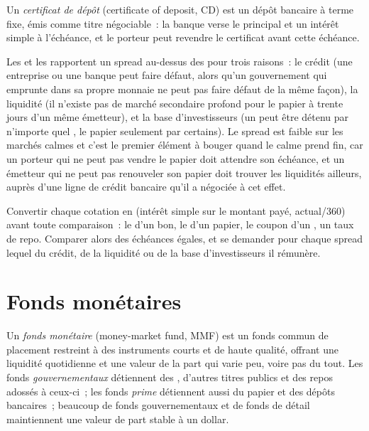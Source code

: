 \begin{definition}\label{def:m2:money-markets:cd}
Un \emph{certificat de dépôt} (certificate of deposit, CD) est un dépôt bancaire
à terme fixe, émis comme titre négociable~: la banque verse
le principal et un intérêt simple à l'échéance, et le porteur peut revendre le
certificat avant cette échéance.
\end{definition}

Les  et les  rapportent un spread au-dessus des  pour trois raisons~: le crédit (une entreprise ou
une banque peut faire défaut, alors qu'un gouvernement qui emprunte dans sa propre monnaie ne peut pas
faire défaut de la même façon), la liquidité (il n'existe pas de marché secondaire profond pour le papier
à trente jours d'un même émetteur), et la base d'investisseurs (un  peut être détenu par n'importe quel
, le papier seulement par certains). Le spread est faible sur les marchés calmes et c'est le
premier élément à bouger quand le calme prend fin, car un porteur qui ne peut pas vendre le papier
doit attendre son échéance, et un émetteur qui ne peut pas renouveler son papier doit trouver
les liquidités ailleurs, auprès d'une ligne de crédit bancaire qu'il a négociée à cet effet.

\begin{method}\label{met:m2:money-markets:compare}
Convertir chaque cotation en  (intérêt simple sur le montant
payé, actual/360) avant toute comparaison~: le  d'un bon, le 
d'un papier, le coupon d'un , un taux de repo. Comparer alors des échéances égales, et se demander
pour chaque spread lequel du crédit, de la liquidité ou de la base d'investisseurs il rémunère.
\end{method}

\section{Fonds monétaires}

\begin{definition}\label{def:m2:money-markets:mmf}
Un \emph{fonds monétaire} (money-market fund, MMF) est un fonds commun de placement
restreint à des instruments courts et de haute qualité, offrant une liquidité quotidienne et
une valeur de la part qui varie peu, voire pas du tout. Les fonds \emph{gouvernementaux} détiennent
des , d'autres titres publics et des repos adossés à ceux-ci~; les fonds \emph{prime}
détiennent aussi du papier et des dépôts bancaires~; beaucoup de fonds gouvernementaux et de fonds de détail
maintiennent une valeur de part stable à un dollar.
\end{definition}

